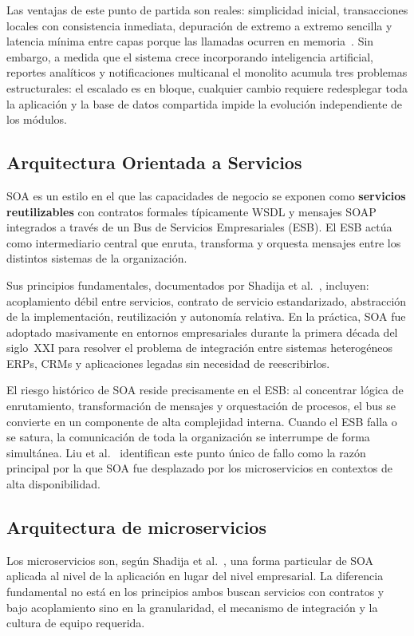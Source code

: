 \documentclass[12pt, a4paper]{article}
\begin{document}
Las ventajas de este punto de partida son reales: simplicidad inicial, transacciones
locales con consistencia inmediata, depuración de extremo a extremo sencilla y
latencia mínima entre capas porque las llamadas ocurren en memoria~\cite{blinowski2022}.
Sin embargo, a medida que el sistema crece incorporando inteligencia artificial,
reportes analíticos y notificaciones multicanal el monolito acumula tres problemas
estructurales: el escalado es en bloque, cualquier cambio requiere redesplegar toda
la aplicación y la base de datos compartida impide la evolución independiente de
los módulos.

\subsection{Arquitectura Orientada a Servicios}

SOA es un estilo en el que las capacidades de negocio se exponen como
\textbf{servicios reutilizables} con contratos formales típicamente WSDL y
mensajes SOAP integrados a través de un Bus de Servicios Empresariales (ESB).
El ESB actúa como intermediario central que enruta, transforma y orquesta mensajes
entre los distintos sistemas de la organización.

Sus principios fundamentales, documentados por Shadija et al.~\cite{shadija2017},
incluyen: acoplamiento débil entre servicios, contrato de servicio estandarizado,
abstracción de la implementación, reutilización y autonomía relativa. En la
práctica, SOA fue adoptado masivamente en entornos empresariales durante la primera
década del siglo~XXI para resolver el problema de integración entre sistemas
heterogéneos ERPs, CRMs y aplicaciones legadas sin necesidad de reescribirlos.

El riesgo histórico de SOA reside precisamente en el ESB: al concentrar lógica de
enrutamiento, transformación de mensajes y orquestación de procesos, el bus se
convierte en un componente de alta complejidad interna. Cuando el ESB falla o se
satura, la comunicación de toda la organización se interrumpe de forma simultánea.
Liu et al.~\cite{liu2020} identifican este punto único de fallo como la razón
principal por la que SOA fue desplazado por los microservicios en contextos de alta
disponibilidad.

\subsection{Arquitectura de microservicios}

Los microservicios son, según Shadija et al.~\cite{shadija2017}, una forma
particular de SOA aplicada al nivel de la aplicación en lugar del nivel empresarial.
La diferencia fundamental no está en los principios ambos buscan servicios con
contratos y bajo acoplamiento sino en la granularidad, el mecanismo de integración
y la cultura de equipo requerida.
\end{document}
